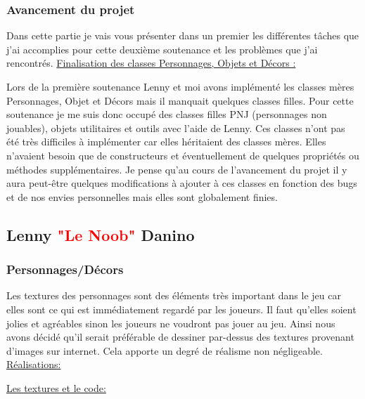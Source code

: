 \documentclass{article}
\begin{document}
\subsubsection{Avancement du projet}

\par
Dans cette partie je vais vous présenter dans un premier les différentes tâches que j'ai accomplies pour cette deuxième  soutenance et les problèmes que j'ai rencontrés.
\newline
\newline
\underline{Finalisation des classes Personnages, Objets et Décors :}

\par
Lors de la première soutenance Lenny et moi avons implémenté les classes mères Personnages, Objet et Décors mais il manquait quelques classes filles. Pour cette soutenance je me suis donc occupé des classes filles PNJ (personnages non jouables), objets utilitaires et outils avec l’aide de Lenny. Ces classes n’ont pas été très difficiles à implémenter car elles héritaient des classes mères. Elles n’avaient besoin que de constructeurs et éventuellement de quelques propriétés ou méthodes supplémentaires. Je pense qu’au cours de l’avancement du projet il y aura peut-être quelques modifications à ajouter à ces classes en fonction des bugs et de nos envies personnelles mais elles sont globalement finies.

\subsection{Lenny \textcolor{red}{"Le Noob"} Danino}
\subsubsection{Personnages/Décors}

\par
Les textures des personnages sont des éléments très important dans le jeu car elles sont ce qui est immédiatement regardé par les joueurs. Il faut qu’elles soient jolies et agréables sinon les joueurs ne voudront pas jouer au jeu. Ainsi nous avons décidé qu’il serait préférable de dessiner par-dessus des textures provenant d’images sur internet. Cela apporte un degré de réalisme non négligeable.
\newline
\newline
\underline{Réalisations:}

\par
\underline{Les textures et le code:}
\newline
\end{document}
